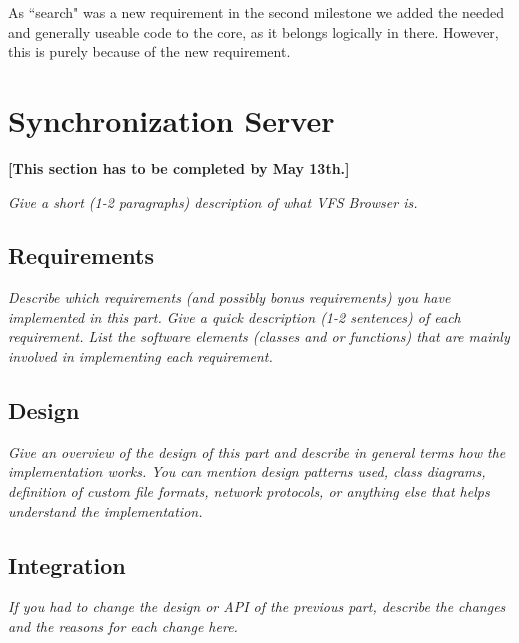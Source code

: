 \documentclass[a4paper,12pt]{article}
\begin{document}
As ``search" was a new requirement in the second milestone we added the needed and generally useable code to the core, as it belongs logically in there. However, this is purely because of the new requirement.




\section{Synchronization Server}

\textbf{[This section has to be completed by May 13th.]}

\emph{Give a short (1-2 paragraphs) description of what VFS Browser is.}


\subsection{Requirements}

\emph{Describe which requirements (and possibly bonus requirements) you have implemented in this part. Give a quick description (1-2 sentences) of each requirement. List the software elements (classes and or functions) that are mainly involved in implementing each requirement.}


\subsection{Design}

\emph{Give an overview of the design of this part and describe in general terms how the implementation works. You can mention design patterns used, class diagrams, definition of custom file formats, network protocols, or anything else that helps understand the implementation.}


\subsection{Integration}

\emph{If you had to change the design or API of the previous part, describe the changes and the reasons for each change here.}
\end{document}
